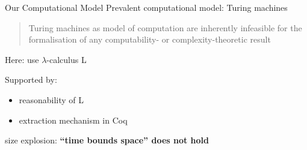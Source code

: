 \documentclass[11pt,usenames,dvipsnames,
hyperref={pdfencoding=auto,psdextra}]{beamer}
\newcommand{\colorHTwo}{\color{blue}}
\newcommand{\bnfmid}{~\mid~}
\begin{document}






\begin{frame}{Our Computational Model}
  Prevalent computational model: Turing machines 
  $~$\\[5ex]
  \begin{quote}
    Turing machines as model of computation are inherently infeasible for the formalisation of any computability- or complexity-theoretic result
  \end{quote}
  \raggedleft{} \cite{ForsterEtAl:2019:VerifiedTMs}

  \raggedright{}
  Here: use $\lambda$-calculus L

  Supported by: 
  \begin{itemize}
    \item reasonability of L~\cite{ForsterKunzeRoth:2019:wcbv-Reasonable}
    \item extraction mechanism in Coq~\cite{ForsterKunze:2019:Certifying-extraction}
  \end{itemize}

  size explosion: \textbf{``time bounds space'' does not hold}
\end{frame}

\newcommand{\Term}{\textsf{term}}
\end{document}
